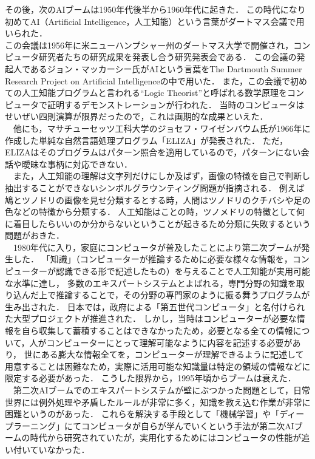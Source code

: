 \newpage
その後，次のAIブームは1950年代後半から1960年代に起きた．
この時代になり初めてAI（Artificial Intelligence，人工知能）という言葉がダートマス会議で用いられた．\\
この会議は1956年に米ニューハンプシャー州のダートマス大学で開催され，コンピュータ研究者たちの研究成果を発表し合う研究発表会である．
この会議の発起人であるジョン・マッカーシー氏がAIという言葉をThe Dartmouth Summer Research Project on Artificial Intelligence\cite{ronbun2}の中で用いた．
また，この会議で初めての人工知能プログラムと言われる“Logic Theorist”と呼ばれる数学原理をコンピュータで証明するデモンストレーションが行われた．
当時のコンピュータはせいぜい四則演算が限界だったので，これは画期的な成果といえた．\\
　他にも，マサチューセッツ工科大学のジョセフ・ワイゼンバウム氏が1966年に作成した単純な自然言語処理プログラム「ELIZA」が発表された．
ただ，ELIZAはそのプログラムはパターン照合を適用しているので，パターンにない会話や曖昧な事柄に対応できない．\\
　また，人工知能の理解は文字列だけにしか及ばず，画像の特徴を自己で判断し抽出することができないシンボルグラウンティング問題が指摘される．
例えば鳩とツノドリの画像を見せ分類するとする時，人間はツノドリのクチバシや足の色などの特徴から分類する．
人工知能はことの時，ツノメドリの特徴として何に着目したらいいのか分からないということが起きるため分類に失敗するという問題がおきた．\\
　1980年代に入り，家庭にコンピュータが普及したことにより第二次ブームが発生した．
「知識」（コンピューターが推論するために必要な様々な情報を，コンピューターが認識できる形で記述したもの）を与えることで人工知能が実用可能な水準に達し，
多数のエキスパートシステムとよばれる，専門分野の知識を取り込んだ上で推論することで，その分野の専門家のように振る舞うプログラムが生み出された．
日本では，政府による「第五世代コンピュータ」と名付けられた大型プロジェクトが推進された．
しかし，当時はコンピューターが必要な情報を自ら収集して蓄積することはできなかったため，必要となる全ての情報について，人がコンピューターにとって理解可能なように内容を記述する必要があり，
世にある膨大な情報全てを，コンピューターが理解できるように記述して用意することは困難なため，実際に活用可能な知識量は特定の領域の情報などに限定する必要があった．
こうした限界から，1995年頃からブームは衰えた．\\
　第二次AIブームでのエキスパートシステムが壁にぶつかった問題として，日常世界には例外処理や矛盾したルールが非常に多く，知識を教え込む作業が非常に困難というのがあった．
これらを解決する手段として「機械学習」や「ディープラーニング」にてコンピュータが自らが学んでいくという手法が第二次AIブームの時代から研究されていたが，実用化するためにはコンピュータの性能が追い付いていなかった．\\
